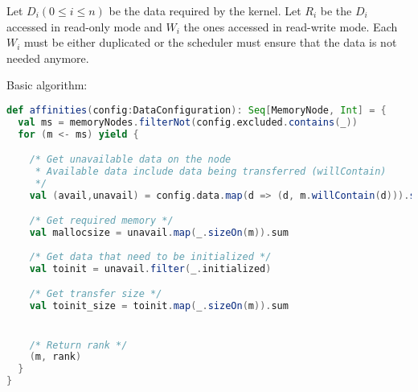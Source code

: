 Let $D_i (0 \le i \le n)$ be the data required by the kernel.
Let $R_i$ be the $D_i$ accessed in read-only mode and $W_i$ the ones accessed in read-write mode.
Each $W_i$ must be either duplicated or the scheduler must ensure that the data is not needed anymore.

Basic algorithm:

\begin{lstlisting}[language=scala]
def affinities(config:DataConfiguration): Seq[MemoryNode, Int] = {
  val ms = memoryNodes.filterNot(config.excluded.contains(_))
  for (m <- ms) yield {

    /* Get unavailable data on the node
     * Available data include data being transferred (willContain)
     */
    val (avail,unavail) = config.data.map(d => (d, m.willContain(d))).split(_._2)

    /* Get required memory */
    val mallocsize = unavail.map(_.sizeOn(m)).sum
    
    /* Get data that need to be initialized */
    val toinit = unavail.filter(_.initialized)

    /* Get transfer size */
    val toinit_size = toinit.map(_.sizeOn(m)).sum


    /* Return rank */
    (m, rank)
  }
}
\end{lstlisting}
